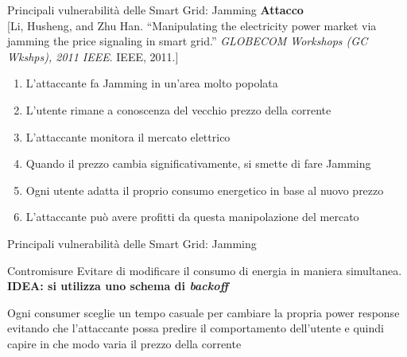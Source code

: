 \begin{frame}{Principali vulnerabilità delle Smart Grid: Jamming}
	\textbf{Attacco}\\
	{\small [Li, Husheng, and Zhu Han. ``Manipulating the electricity power market via jamming the price signaling in smart grid.'' \emph{GLOBECOM Workshops (GC Wkshps), 2011 IEEE}. IEEE, 2011.]}
	\begin{enumerate}[<+- | alert@+>]
		\item L'attaccante fa Jamming in un'area molto popolata
		\item L'utente rimane a conoscenza del vecchio prezzo della corrente
		\item L'attaccante monitora il mercato elettrico
		\item Quando il prezzo cambia significativamente, si smette di fare Jamming
		\item Ogni utente adatta il proprio consumo energetico in base al nuovo prezzo
		\item L'attaccante può avere profitti da questa manipolazione del mercato
	\end{enumerate}
\end{frame}

\begin{frame}{Principali vulnerabilità delle Smart Grid: Jamming}
	\begin{block}{Contromisure}
		Evitare di modificare il consumo di energia in maniera simultanea.\newline
		\textbf{\color{blue_slides}IDEA: si utilizza uno schema di \emph{backoff}} 
	\end{block}
	\pause
	\begin{block}{}
	Ogni consumer sceglie un tempo casuale per cambiare la propria power response evitando che l'attaccante possa predire il comportamento dell'utente e quindi capire in che modo varia il prezzo della corrente
	\end{block}
\end{frame}